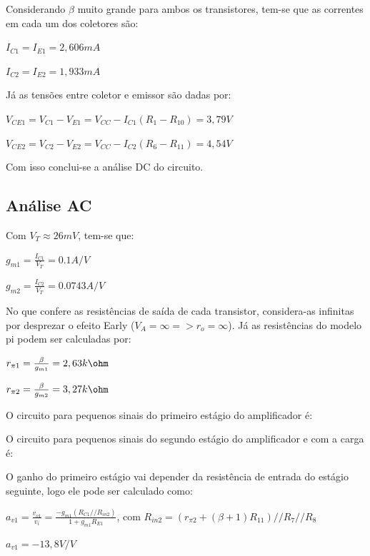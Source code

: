 Considerando $\beta$ muito grande para ambos os transistores, tem-se que as correntes em cada um dos coletores são:

\begin{center}
    $I_{C1} = I_{E1} = 2,606mA$  
    
    $I_{C2} = I_{E2} = 1,933mA$  
\end{center}

Já as tensões entre coletor e emissor são dadas por:

\begin{center}
    $V_{CE1} = V_{C1} - V_{E1} = V_{CC} - I_{C1}(R_{1}-R_{10}) = 3,79V$  
    
    $V_{CE2} = V_{C2} - V_{E2} = V_{CC} - I_{C2}(R_{6}-R_{11}) = 4,54V$   
\end{center}

Com isso conclui-se a análise DC do circuito.

\subsection{Análise AC}

Com $V_T \approx 26mV$, tem-se que:
\begin{center}
    $g_{m1} = \frac{I_{C1}}{V_T} = 0.1 A/V$ 
    
    $g_{m2} = \frac{I_{C2}}{V_T} = 0.0743 A/V$ 
\end{center}

No que confere as resistências de saída de cada transistor, considera-as infinitas por desprezar o efeito Early ($V_A=\infty => r_o = \infty$). Já as resistências do modelo pi podem ser calculadas por:

\begin{center}
    $r_{\pi1} = \frac{\beta}{g_{m1}} = 2,63k\ohm$ 
    
    $r_{\pi2} = \frac{\beta}{g_{m2}} = 3,27k\ohm$ 
\end{center}

O circuito para pequenos sinais do primeiro estágio do amplificador é:



O circuito para pequenos sinais do segundo estágio do amplificador e com a carga é:



O ganho do primeiro estágio vai depender da resistência de entrada do estágio seguinte, logo ele pode ser calculado como:

\begin{center}
     $a_{v1} = \frac{v_{o1}}{v_{i}} = \frac{-g_{m1}(R_{C1}//R_{in2})}{1+g_{m1}R_{E1}}$, com $R_{in2}=(r_{\pi2}+(\beta +1)R_{11})//R_7//R_8$
     
     $a_{v1} =  -13,8 V/V$
\end{center}

